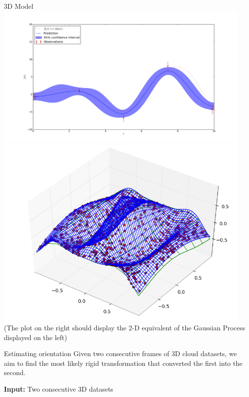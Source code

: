 \documentclass[final]{beamer}
\begin{document}
\begin{frame}{}
\begin{textblock}{27.5}
\begin{block}{3D Model}
\includegraphics[width=5in]{1DGaussianProcess.png}
\includegraphics[width=5in]{2DGaussianProcess.png}
(The plot on the right should display the 2-D equivalent of the Gaussian Process displayed on the left)
\end{block}

\begin{block}{Estimating orientation}
Given two consecutive frames of 3D cloud datasets, we aim to find the most likely rigid transformation that converted the first into the second.

\textbf{Input:} Two consecutive 3D datasets


\end{block}
\end{textblock}
\end{frame}
\end{document}
